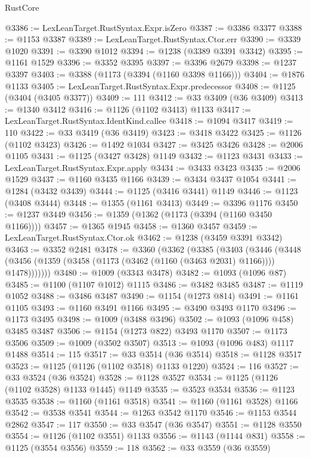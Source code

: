 \begin{lexlean}{RustCore}
\begin{coremodule}
@3386 := LexLeanTarget.RustSyntax.Expr.isZero
@3387 := @3386 @3377
@3388 := @1153 @3387
@3389 := LexLeanTarget.RustSyntax.Ctor.err
@3390 := @3339 @1020
@3391 := @3390 @1012
@3394 := @1238 (@3389 @3391 @3342)
@3395 := @1161 @1529
@3396 := @3352 @3395
@3397 := @3396 @2679
@3398 := @1237 @3397
@3403 := @3388 (@1173 (@3394 (@1160 @3398 @1166)))
@3404 := @1876 @1133
@3405 := LexLeanTarget.RustSyntax.Expr.predecessor
@3408 := @1125 (@3404 (@3405 @3377))
@3409 := 111
@3412 := @33 @3409 (@36 @3409)
@3413 := @1340 @3412
@3416 := @1126 (@1102 @3413) @1133
@3417 := LexLeanTarget.RustSyntax.IdentKind.callee
@3418 := @1094 @3417
@3419 := 110
@3422 := @33 @3419 (@36 @3419)
@3423 := @3418 @3422
@3425 := @1126 (@1102 @3423)
@3426 := @1492 @1034
@3427 := @3425 @3426
@3428 := @2006 @1105
@3431 := @1125 (@3427 @3428) @1149
@3432 := @1123 @3431
@3433 := LexLeanTarget.RustSyntax.Expr.apply
@3434 := @3433 @3423
@3435 := @2006 @1529
@3437 := @1160 @3435 @1166
@3439 := @3434 @3437 @1054
@3441 := @1284 (@3432 @3439)
@3444 := @1125 (@3416 @3441) @1149
@3446 := @1123 (@3408 @3444)
@3448 := @1355 (@1161 @3413)
@3449 := @3396 @1176
@3450 := @1237 @3449
@3456 := @1359 (@1362 (@1173 (@3394 (@1160 @3450 @1166))))
@3457 := @1365 @1945
@3458 := @1360 @3457
@3459 := LexLeanTarget.RustSyntax.Ctor.ok
@3462 := @1238 (@3459 @3391 @3342)
@3463 := @3352 @2481
@3478 := @3360
    (@3362
      (@3385
        (@3403
          (@3446
            (@3448 (@3456 (@1359 (@3458 (@1173 (@3462 (@1160 (@3463 @2031) @1166)))) @1478)))))))
@3480 := @1009 (@3343 @3478)
@3482 := @1093 (@1096 @87)
@3485 := @1100 (@1107 @1012) @1115
@3486 := @3482 @3485
@3487 := @1119 @1052
@3488 := @3486 @3487
@3490 := @1154 (@1273 @814)
@3491 := @1161 @1105
@3493 := @1160 @3491 @1166
@3495 := @3490 @3493 @1170
@3496 := @1173 @3495
@3498 := @1009 (@3488 @3496)
@3502 := @1093 (@1096 @458) @3485 @3487
@3506 := @1154 (@1273 @822) @3493 @1170
@3507 := @1173 @3506
@3509 := @1009 (@3502 @3507)
@3513 := @1093 (@1096 @483) @1117 @1488
@3514 := 115
@3517 := @33 @3514 (@36 @3514)
@3518 := @1128 @3517
@3523 := @1125 (@1126 (@1102 @3518) @1133 @1220)
@3524 := 116
@3527 := @33 @3524 (@36 @3524)
@3528 := @1128 @3527
@3534 := @1125 (@1126 (@1102 @3528) @1133 @1445) @1149
@3535 := @3523 @3534
@3536 := @1123 @3535
@3538 := @1160 (@1161 @3518)
@3541 := @1160 (@1161 @3528) @1166
@3542 := @3538 @3541
@3544 := @1263 @3542 @1170
@3546 := @1153 @3544 @2862
@3547 := 117
@3550 := @33 @3547 (@36 @3547)
@3551 := @1128 @3550
@3554 := @1126 (@1102 @3551) @1133
@3556 := @1143 (@1144 @831)
@3558 := @1125 (@3554 @3556)
@3559 := 118
@3562 := @33 @3559 (@36 @3559)

\end{coremodule}
\end{lexlean}
